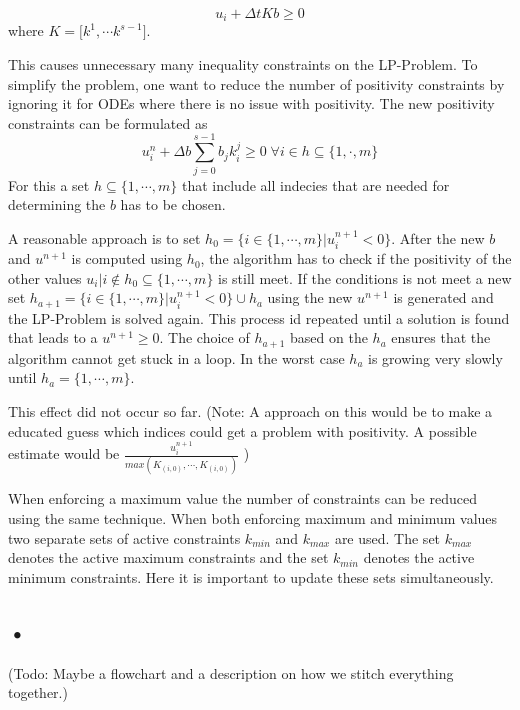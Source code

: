 \documentclass[a4paper]{scrartcl}
\numberwithin{equation}{section}
\theoremstyle{plain}
\theoremstyle{definition}
\numberwithin{theorem}{section}
\newcommand{\dt}{{\Delta t}}
\newcommand{\1}{\mathbbm{1}}
\begin{document}
\begin{equation}
u_i + \dt K  b \geq 0     
\end{equation}
where $K = \big[k^1 , \cdots k^{s-1}\big]$.

This causes unnecessary many inequality constraints on the LP-Problem. To simplify the problem, one want to reduce the number of positivity constraints by ignoring it for ODEs where there is no issue with positivity.
The new positivity constraints can be formulated as
\begin{equation}
u_i^n + \Delta b \sum_{j=0}^{s-1} b_j k_i^j  \geq 0   \;   \forall {i \in h \subseteq \{1,\cdot,m \}} 
\end{equation}
For this a set $h \subseteq \{1,\cdots,m \}$ that include all indecies that are needed for determining the $b$ has to be chosen.

A reasonable approach is to set $h_0 = \{ i \in \{1,\cdots,m \} |  u_i^{n+1}  < 0 \}$. 
After the new $b$ and $u^{n+1}$ is computed using $h_0$, the algorithm has to check if the positivity of the other values $u_i | i \notin h_0 \subseteq \{1,\cdots,m \}$ is still meet. 
If the conditions is not meet a new set $h_{a+1} = \{ i \in \{1,\cdots,m \}|  u_i^{n+1}  < 0 \} \cup h_{a}$ using the new $u^{n+1}$ is generated and the LP-Problem is solved again. This process id repeated until a solution is found that leads to a $u^{n+1} \geq 0$. The choice of $h_{a+1}$ based on the $h_{a}$ ensures that the algorithm cannot get stuck in a loop. In the worst case $h_a$ is growing very slowly until $h_a = \{1,\cdots,m \}$. 

This effect did not occur so far. 
(Note: A approach on this would be to make a educated guess which indices could get a problem with positivity. A possible estimate would be $\frac{u_i^{n+1}}{max(K_{(i,0)}, \cdots ,K_{(i,0)})} $ )

When enforcing a maximum value the number of constraints can be reduced using the same technique. When both enforcing maximum and minimum values two separate sets of active constraints $k_{min}$ and $k_{max}$ are used. The set $k_{max}$ denotes the active maximum constraints and the set $k_{min}$ denotes the active minimum constraints. 
Here it is important to update these sets simultaneously.  

\subsection{•}
(Todo: Maybe a flowchart and a description on how we stitch everything together.) 
\end{document}
